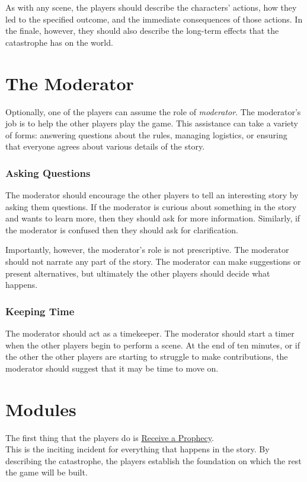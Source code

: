 \documentclass[12pt, a5paper, parskip=half-, footheight=1.4cm]{scrartcl}
\begin{document}
As with any scene, the players should describe the characters' actions, how they led to the specified outcome, and the immediate consequences of those actions.
In the finale, however, they should also describe the long-term effects that the catastrophe has on the world.



\newpage

\section*{The Moderator} \label{section:the-moderator}
Optionally, one of the players can assume the role of \emph{moderator}. The moderator's job is to help the other players play the game. This assistance can take a variety of forms: answering questions about the rules, managing logistics, or ensuring that everyone agrees about various details of the story.

\subsubsection*{Asking Questions} \label{subsubsection:asking-questions}
The moderator should encourage the other players to tell an interesting story by asking them questions.  If the moderator is curious about something in the story and wants to learn more, then they should ask for more information.  Similarly, if the moderator is confused then they should ask for clarification.

Importantly, however, the moderator's role is not prescriptive.  The moderator should not narrate any part of the story. The moderator can make suggestions or present alternatives, but ultimately the other players should decide what happens.

\subsubsection*{Keeping Time} \label{subsubsection:keeeping-time}
The moderator should act as a timekeeper. 
The moderator should start a timer when the other players begin to perform a scene.
At the end of ten minutes, or if the other the other players are starting to struggle to make contributions, the moderator should suggest that it may be time to move on.

\newpage

\section*{Modules} \label{section:modules}
The first thing that the players do is \hyperref[subsection:receive-a-prophecy]{\cinzel \small Receive a Prophecy}.  \\
This is the inciting incident for everything that happens in the story.
By describing the catastrophe, the players establish the foundation on which the rest the game will be built.
\end{document}
